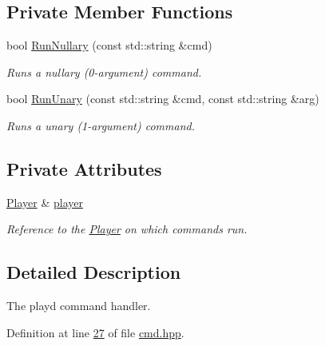 \subsection*{Private Member Functions}
\begin{DoxyCompactItemize}
\item 
bool \hyperlink{classCommandHandler_a22ac65683643c6f6037441a8e5fd04d4}{Run\+Nullary} (const std\+::string \&cmd)
\begin{DoxyCompactList}\small\item\em Runs a nullary (0-\/argument) command. \end{DoxyCompactList}\item 
bool \hyperlink{classCommandHandler_a75904aa3532bba1e548fbcff00544d46}{Run\+Unary} (const std\+::string \&cmd, const std\+::string \&arg)
\begin{DoxyCompactList}\small\item\em Runs a unary (1-\/argument) command. \end{DoxyCompactList}\end{DoxyCompactItemize}
\subsection*{Private Attributes}
\begin{DoxyCompactItemize}
\item 
\hypertarget{classCommandHandler_a398ba97a0625f5fbc3ced6679cfd3766}{\hyperlink{classPlayer}{Player} \& \hyperlink{classCommandHandler_a398ba97a0625f5fbc3ced6679cfd3766}{player}}\label{classCommandHandler_a398ba97a0625f5fbc3ced6679cfd3766}

\begin{DoxyCompactList}\small\item\em Reference to the \hyperlink{classPlayer}{Player} on which commands run. \end{DoxyCompactList}\end{DoxyCompactItemize}


\subsection{Detailed Description}
The playd command handler. 

Definition at line \hyperlink{cmd_8hpp_source_l00027}{27} of file \hyperlink{cmd_8hpp_source}{cmd.\+hpp}.



